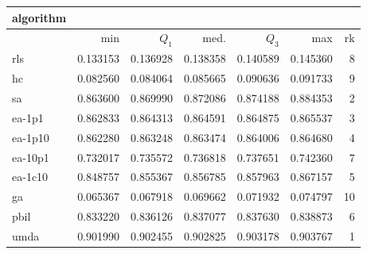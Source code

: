 \begin{tabular}{@{}l*{5}{>{{}}N{1}{3}}>{{}}N{2}{0}@{}}
\toprule
{algorithm} &  \\
\midrule
& {min} & {$Q_1$} & {med.} & {$Q_3$} & {max} & {rk}\\
\midrule
rls & 0.133153 & 0.136928 & 0.138358 & 0.140589 & 0.145360 & 8\\
hc & 0.082560 & 0.084064 & 0.085665 & 0.090636 & 0.091733 & 9\\
sa & 0.863600 & 0.869990 & 0.872086 & 0.874188 & 0.884353 & 2\\
ea-1p1 & 0.862833 & 0.864313 & 0.864591 & 0.864875 & 0.865537 & 3\\
ea-1p10 & 0.862280 & 0.863248 & 0.863474 & 0.864006 & 0.864680 & 4\\
ea-10p1 & 0.732017 & 0.735572 & 0.736818 & 0.737651 & 0.742360 & 7\\
ea-1c10 & 0.848757 & 0.855367 & 0.856785 & 0.857963 & 0.867157 & 5\\
ga & 0.065367 & 0.067918 & 0.069662 & 0.071932 & 0.074797 & 10\\
pbil & 0.833220 & 0.836126 & 0.837077 & 0.837630 & 0.838873 & 6\\
umda & {\color{blue}} 0.901990 & {\color{blue}} 0.902455 & {\color{blue}} 0.902825 & {\color{blue}} 0.903178 & {\color{blue}} 0.903767 & 1\\
\bottomrule
\end{tabular}
